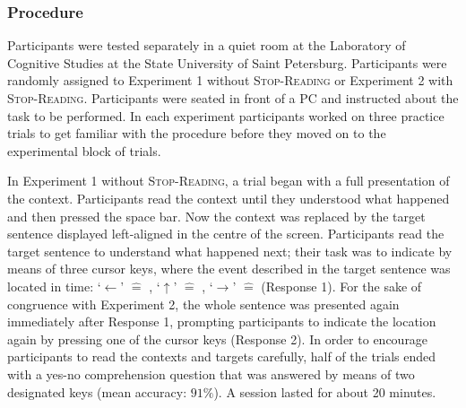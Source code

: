\documentclass[output=paper,colorlinks,citecolor=brown,newtxmath,hidelinks]{langscibook}
\begin{document}
\subsubsection{Procedure}\label{sct:zwei.eins.drei}

Participants were tested separately in a quiet room at the Laboratory of Cognitive Studies at the State University of Saint Petersburg. Participants were randomly assigned to Experiment 1 without \textsc{Stop-Reading} or Experiment 2 with \textsc{Stop-Reading}. Participants were seated in front of a PC and instructed about the task to be performed. In each experiment participants worked on three practice trials to get familiar with the procedure before they moved on to the experimental block of trials.

In Experiment 1 without \textsc{Stop-Reading}, a trial began with a full presentation of the context. Participants read the context until they understood what happened and then pressed the space bar. Now the context was replaced by the target sentence displayed left-aligned in the centre of the screen. Participants read the target sentence to understand what happened next; their task was to indicate by means of three cursor keys, where the event described in the target sentence was located in time: ‘$\leftarrow$’ $\hat{=}$ , ‘$\uparrow$’ $\hat{=}$ , ‘$\rightarrow$’ $\hat{=}$  (Response 1). For the sake of congruence with Experiment 2, the whole sentence was presented again immediately after Response 1, prompting participants to indicate the location again by pressing one of the cursor keys (Response 2). In order to encourage participants to read the contexts and targets carefully, half of the trials ended with a yes-no comprehension question that was answered by means of two designated keys (mean accuracy: $91\%$). A session lasted for about 20 minutes.
\end{document}
